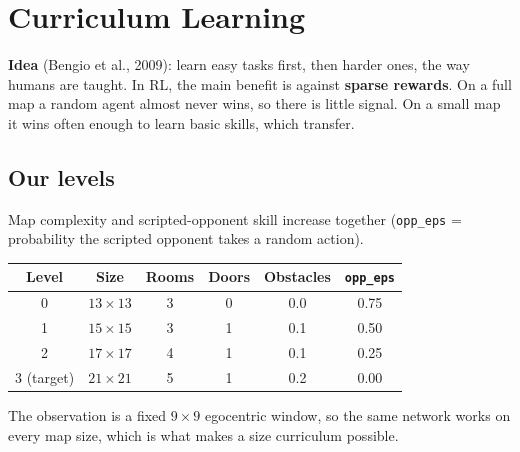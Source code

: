 \documentclass[11pt,a4paper]{article}
\newcommand{\code}[1]{\texttt{#1}}
\begin{document}
\section{Curriculum Learning}
\textbf{Idea} (Bengio et al., 2009): learn easy tasks first, then harder ones, the way humans
are taught. In RL, the main benefit is against \textbf{sparse rewards}. On a full map a random
agent almost never wins, so there is little signal. On a small map it wins often enough to learn
basic skills, which transfer.

\subsection{Our levels}
Map complexity and scripted-opponent skill increase together
(\code{opp\_eps} = probability the scripted opponent takes a random action).
\begin{center}
\begin{tabular}{cccccc}
\toprule
Level & Size & Rooms & Doors & Obstacles & \code{opp\_eps}\\
\midrule
0 & $13\times13$ & 3 & 0 & 0.0 & 0.75\\
1 & $15\times15$ & 3 & 1 & 0.1 & 0.50\\
2 & $17\times17$ & 4 & 1 & 0.1 & 0.25\\
3 (target) & $21\times21$ & 5 & 1 & 0.2 & 0.00\\
\bottomrule
\end{tabular}
\end{center}
The observation is a fixed $9\times9$ egocentric window, so the same network works on every map
size, which is what makes a size curriculum possible.
\end{document}
